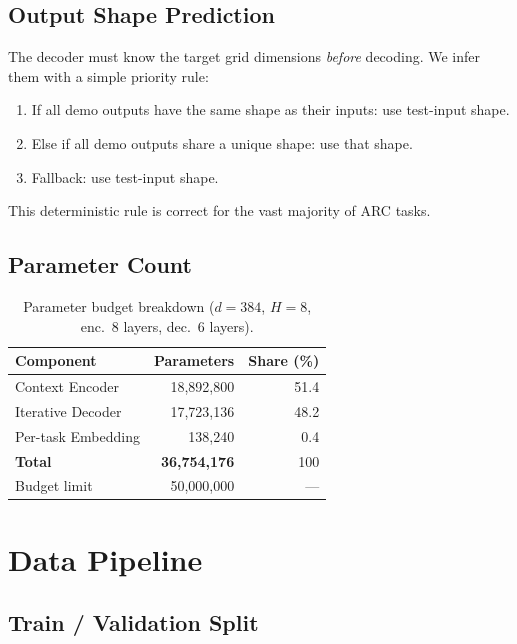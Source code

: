 \documentclass[11pt,a4paper]{article}
\begin{document}
\subsection{Output Shape Prediction}

The decoder must know the target grid dimensions \emph{before} decoding.  We infer them
with a simple priority rule:
\begin{enumerate}[noitemsep,label=\arabic*.]
  \item If all demo outputs have the same shape as their inputs: use test-input shape.
  \item Else if all demo outputs share a unique shape: use that shape.
  \item Fallback: use test-input shape.
\end{enumerate}
This deterministic rule is correct for the vast majority of ARC tasks.

\subsection{Parameter Count}
\label{ssec:params}

\begin{table}[H]
\centering
\caption{Parameter budget breakdown ($d{=}384$, $H{=}8$, enc.\ 8 layers, dec.\ 6 layers).}
\label{tab:params}
\begin{tabular}{lrr}
\toprule
Component & Parameters & Share (\%) \\
\midrule
Context Encoder   & 18,892,800 & 51.4 \\
Iterative Decoder & 17,723,136 & 48.2 \\
Per-task Embedding & 138,240   & 0.4  \\
\midrule
\textbf{Total}    & \textbf{36,754,176} & 100 \\
Budget limit      & 50,000,000 & ---  \\
\bottomrule
\end{tabular}
\end{table}

\section{Data Pipeline}
\label{sec:data}

\subsection{Train / Validation Split}
\end{document}
